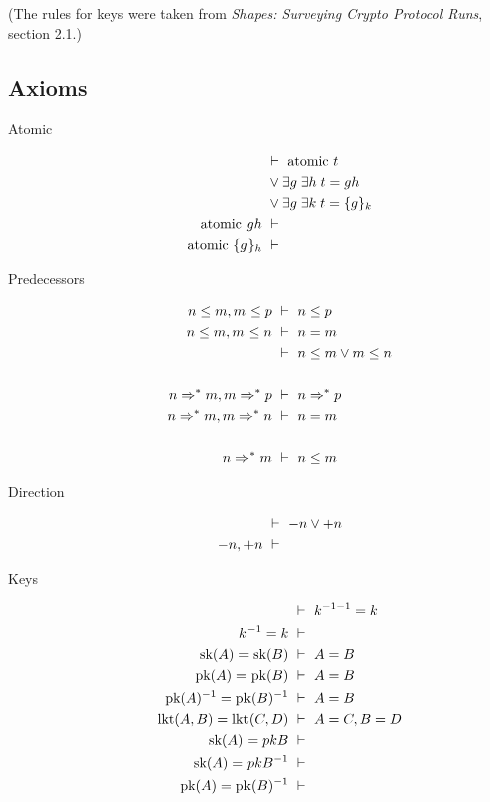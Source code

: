 \documentclass{article}
\begin{document}
(The rules for keys were taken from \emph{Shapes: Surveying Crypto Protocol Runs}, section 2.1.)



\subsection{Axioms}

\begin{description}

\item[Atomic]

\begin{align*}
& \ \vdash\ \mbox{atomic } t \\
    &\ \vee \exists g\; \exists h\; t = g h \\
    &\ \vee \exists g\; \exists k\; t = \{g\}_{k} \\
\mbox{atomic } g h & \ \vdash\  \\
\mbox{atomic } \{g\}_{h} & \ \vdash\ 
\end{align*}

\item[Predecessors]

\begin{align*}
n \leq m, m \leq p & \ \vdash\ n \leq p \\
n \leq m, m \leq n & \ \vdash\ n = m \\
& \ \vdash\ n \leq m \vee m \leq n \\
\\
n \Rightarrow^* m, m \Rightarrow^* p & \ \vdash\ n \Rightarrow^* p \\
n \Rightarrow^* m, m \Rightarrow^* n & \ \vdash\ n = m \\
\\
n \Rightarrow^* m & \ \vdash\ n \leq m
\end{align*}

\item[Direction]

\begin{align*}
& \ \vdash\ -n \vee +n \\
-n, +n & \ \vdash\ 
\end{align*}

\item[Keys]

\begin{align*}
& \ \vdash\ k^{-1 -1} = k \\
k^{-1} = k & \ \vdash\  \\
\mbox{sk}(A) = \mbox{sk}(B) & \ \vdash\ A = B \\
\mbox{pk}(A) = \mbox{pk}(B) & \ \vdash\ A = B \\
\mbox{pk}(A)^{-1} = \mbox{pk}(B)^{-1} & \ \vdash\ A = B \\
\mbox{lkt}(A, B) = \mbox{lkt}(C, D) & \ \vdash\ A = C, B = D \\
\mbox{sk}(A) = pk{B} & \ \vdash\  \\
\mbox{sk}(A) = pk{B}^{-1} & \ \vdash\  \\
\mbox{pk}(A) = \mbox{pk}(B)^{-1} & \ \vdash\ 
\end{align*}


\end{description}
\end{document}

